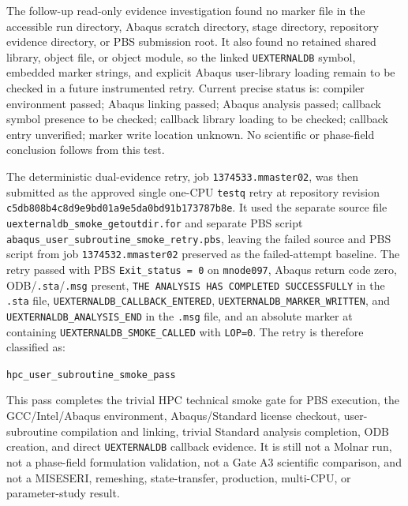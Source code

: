 \documentclass[11pt,a4paper]{article}
\begin{document}
The follow-up read-only evidence investigation found no marker file in the accessible run directory, Abaqus scratch directory, stage directory, repository evidence directory, or PBS submission root. It also found no retained shared library, object file, or object module, so the linked \texttt{UEXTERNALDB} symbol, embedded marker strings, and explicit Abaqus user-library loading remain to be checked in a future instrumented retry. Current precise status is: compiler environment passed; Abaqus linking passed; Abaqus analysis passed; callback symbol presence to be checked; callback library loading to be checked; callback entry unverified; marker write location unknown. No scientific or phase-field conclusion follows from this test.

The deterministic dual-evidence retry, job \texttt{1374533.mmaster02}, was then submitted as the approved single one-CPU \texttt{testq} retry at repository revision \texttt{c5db808b4c8d9e9bd01a9e5da0bd91b173787b8e}. It used the separate source file \texttt{uexternaldb\_smoke\_getoutdir.for} and separate PBS script \texttt{abaqus\_user\_subroutine\_smoke\_retry.pbs}, leaving the failed source and PBS script from job \texttt{1374532.mmaster02} preserved as the failed-attempt baseline. The retry passed with PBS \texttt{Exit\_status = 0} on \texttt{mnode097}, Abaqus return code zero, ODB/\texttt{.sta}/\texttt{.msg} present, \texttt{THE ANALYSIS HAS COMPLETED SUCCESSFULLY} in the \texttt{.sta} file, \texttt{UEXTERNALDB\_CALLBACK\_ENTERED}, \texttt{UEXTERNALDB\_MARKER\_WRITTEN}, and \texttt{UEXTERNALDB\_ANALYSIS\_END} in the \texttt{.msg} file, and an absolute marker at  containing \texttt{UEXTERNALDB\_SMOKE\_CALLED} with \texttt{LOP=0}. The retry is therefore classified as:

\begin{center}
\texttt{hpc\_user\_subroutine\_smoke\_pass}
\end{center}

This pass completes the trivial HPC technical smoke gate for PBS execution, the GCC/Intel/Abaqus environment, Abaqus/Standard license checkout, user-subroutine compilation and linking, trivial Standard analysis completion, ODB creation, and direct \texttt{UEXTERNALDB} callback evidence. It is still not a Molnar run, not a phase-field formulation validation, not a Gate A3 scientific comparison, and not a MISESERI, remeshing, state-transfer, production, multi-CPU, or parameter-study result.
\end{document}
